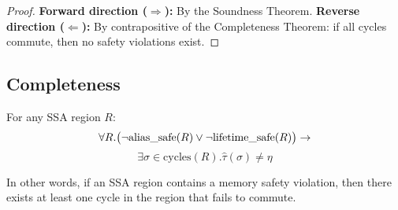 \documentclass[journal]{IEEEtran}
\begin{document}
\begin{proof}
\textbf{Forward direction ($\Rightarrow$):} By the Soundness Theorem.
\textbf{Reverse direction ($\Leftarrow$):} By contrapositive of the Completeness Theorem: if all cycles commute, then no safety violations exist.
\end{proof}

\subsection{Completeness}

\begin{theorem}[Completeness]
For any SSA region $R$:
$$\forall R. \big( \neg \text{alias\_safe}(R) \lor \neg \text{lifetime\_safe}(R) \big) \\
\rightarrow$$
$$ \exists \sigma \in \text{cycles}(R). \hat{\tau}(\sigma) \neq \eta$$

In other words, if an SSA region contains a memory safety violation, then there exists at least one cycle in the region that fails to commute.
\end{theorem}
\end{document}
